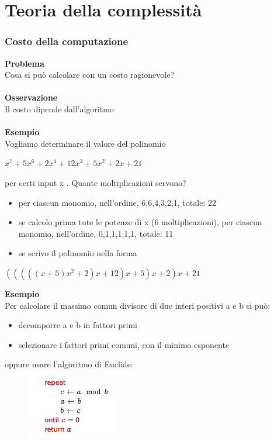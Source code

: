 \chapter{Teoria della complessità} \label{ch:capitolo9}
\subsection{Costo della computazione}
\textbf{Problema}\\
Cosa si può calcolare con un costo ragionevole?\\\\
\textbf{Osservazione}\\
Il costo dipende dall’algoritmo\\\\
\textbf{Esempio}\\
Vogliamo determinare il valore del polinomio
\begin{center}
    $x^7 + 5x^6 + 2x^4 + 12x^3 + 5x^2 + 2x + 21$
\end{center}
per certi input x . Quante moltiplicazioni servono?
\begin{itemize}
    \item per ciascun monomio, nell’ordine, 6,6,4,3,2,1, totale: 22
    
    \item se calcolo prima tute le potenze di x (6 moltiplicazioni), per ciascun monomio, nell’ordine, 0,1,1,1,1,1, totale: 11
    
    \item se scrivo il polinomio nella forma
\end{itemize}
\begin{center}
    $(((((x + 5)x^2 + 2)x + 12)x + 5)x + 2)x + 21$
\end{center}
\newpage
\textbf{Esempio}\\
Per calcolare il massimo comun divisore di due interi positivi a e b si può:
\begin{itemize}
    \item decomporre a e b in fattori primi
    
    \item selezionare i fattori primi comuni, con il minimo esponente
\end{itemize}
oppure usare l’algoritmo di Euclide:\\
\begin{figure}[htp]
    \centering
    \includegraphics[scale=0.9]{tesi_stile/img/f1cap9.png}
\end{figure}
